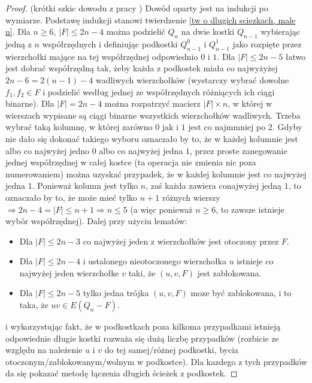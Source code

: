 \documentclass{pracamgr}
\begin{document}
    \begin{proof}
     (krótki szkic dowodu z pracy \cite{FG})\newline
     Dowód oparty jest na indukcji po wymiarze.
     Podstawę indukcji stanowi twierdzenie \ref{tw o dlugich sciezkach, male n}.%
     Dla $n\ge6$, $|F|\le 2n-4$ można podzielić $Q_n$ na dwie kostki $Q_{n-1}$ wybierając jedną z $n$ współrzędnych 
     i definiując podkostki $Q^0_{n-1}$ i $Q^1_{n-1}$ jako rozpięte przez wierzchołki mające na tej współrzędnej odpowiednio $0$ i $1$.
     Dla $|F|\le 2n-5$ łatwo jest dobrać współrzędną tak, żeby każda z podkostek miała co najwyżyżej $2n-6=2(n-1)-4$ wadliwych wierzchołków
     (wystarczy wybrać dowolne $f_1,f_2\in F$ i podzielić według jednej ze współrzędnych różniących ich ciągi binarne).
     Dla $|F|=2n-4$ można rozpatrzyć macierz $|F|\times n$, w której w wierszach wypisane są ciągi binarne wszystkich wierzchołków wadliwych.
     Trzeba wybrać taką kolumnę, w której zarówno $0$ jak i $1$ jest co najmmniej po 2. Gdyby nie dało się dokonać takiego wyboru oznaczało by to, że
     w każdej kolumnie jest albo co najwyżej jedno $0$ albo co najwyżej jedna $1$, przez proste zanegowanie jednej współrzędnej w całej kostce
     (ta operacja nie zmienia nic poza numerowaniem) można uzyskać przypadek, że w każdej kolumnie jest co najwyżej jedna $1$. 
     Ponieważ kolumn jest tylko $n$, zaś każda zawiera conajwyżej jedną $1$, to oznaczało by to, że może mieć tylko $n+1$ różnych wierszy
     $\Rightarrow 2n-4=|F|\le n+1\Rightarrow n\le5$ (a więc ponieważ $n\ge 6$, to zawsze istnieje wybór współrzędnej).\newline
     Dalej przy użyciu lematów:
     \begin{itemize}
      \item Dla $|F|\le 2n-3$ co najwyżej jeden z wierzchołków jest otoczony przez $F$.
      \item Dla $|F|\le 2n-4$ i ustalonego nieotoczonego wierzchołka $u$ istnieje co najwyżej jeden wierzchołke $v$ taki, że $(u,v,F)$ jest zablokowana.
      \item Dla $|F|\le 2n-5$ tylko jedna trójka $(u,v,F)$ moze być zablokowana, i to taka, że $uv\in E(Q_n-F)$.
     \end{itemize}
     i wykorzystując fakt, że w podkostkach poza kilkoma przypadkami istnieją odpowiednie długie kostki rozważa się dużą liczbę przypadków
     (rozbicie ze względu na należenie $u$ i $v$ do tej samej/różnej podkostki, bycia otoczonym/zablokowanym/wolnym w podkostce).
     Dla kazdego z tych przypadków da się pokazać metodę łączenia długich ścieżek z podkostek.
    \end{proof}
\end{document}
